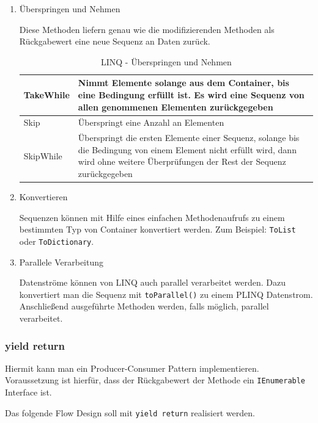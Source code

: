\begin{enumerate}
\item Überspringen und Nehmen

Diese Methoden liefern genau wie die modifizierenden Methoden als Rückgabewert
eine neue Sequenz an Daten zurück.

\bigskip
\begin{table}[H]
	\centering
\begin{tabularx}{\textwidth}{|p{130pt}|X|}
	\hline
TakeWhile & Nimmt Elemente solange aus dem Container, bis eine Bedingung erfüllt ist. Es wird eine Sequenz von allen genommenen Elementen zurückgegeben\\	\hline
Skip & Überspringt eine Anzahl an Elementen\\	\hline
SkipWhile & Überspringt die ersten Elemente einer Sequenz, solange bis die Bedingung von einem Element nicht erfüllt wird, dann wird ohne weitere Überprüfungen der Rest der Sequenz zurückgegeben\\	\hline
\end{tabularx}
	\medskip
	\caption{LINQ - Überspringen und Nehmen}
	
\end{table}

\item Konvertieren

Sequenzen können mit Hilfe eines einfachen Methodenaufrufs zu einem bestimmten Typ
von Container konvertiert werden. Zum Beispiel: \texttt{ToList} oder \texttt{ToDictionary}.

\item Parallele Verarbeitung

Datenströme können von LINQ auch parallel verarbeitet werden. Dazu konvertiert
man die Sequenz mit \texttt{toParallel()} zu einem PLINQ Datenstrom.
Anschließend ausgeführte Methoden werden, falls möglich, parallel verarbeitet.

\end{enumerate}


\subsubsection{yield return}

Hiermit kann man ein Producer-Consumer Pattern implementieren.
Voraussetzung ist hierfür, dass der Rückgabewert der Methode ein \texttt{IEnumerable} Interface ist.

Das folgende Flow Design soll mit \texttt{yield return} realisiert werden.

